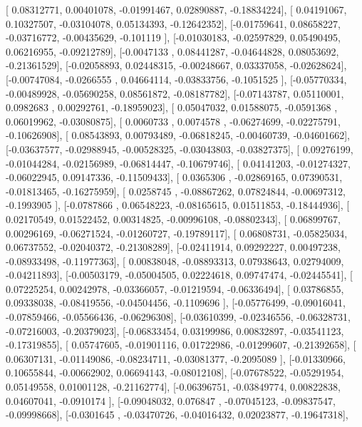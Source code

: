 \documentclass{article}
\begin{document}
       [ 0.08312771,  0.00401078, -0.01991467,  0.02890887, -0.18834224],
       [ 0.04191067,  0.10327507, -0.03104078,  0.05134393, -0.12642352],
       [-0.01759641,  0.08658227, -0.03716772, -0.00435629, -0.101119  ],
       [-0.01030183, -0.02597829,  0.05490495,  0.06216955, -0.09212789],
       [-0.0047133 ,  0.08441287, -0.04644828,  0.08053692, -0.21361529],
       [-0.02058893,  0.02448315, -0.00248667,  0.03337058, -0.02628624],
       [-0.00747084, -0.0266555 ,  0.04664114, -0.03833756, -0.1051525 ],
       [-0.05770334, -0.00489928, -0.05690258,  0.08561872, -0.08187782],
       [-0.07143787,  0.05110001,  0.0982683 ,  0.00292761, -0.18959023],
       [ 0.05047032,  0.01588075, -0.0591368 ,  0.06019962, -0.03080875],
       [ 0.0060733 ,  0.0074578 , -0.06274699, -0.02275791, -0.10626908],
       [ 0.08543893,  0.00793489, -0.06818245, -0.00460739, -0.04601662],
       [-0.03637577, -0.02988945, -0.00528325, -0.03043803, -0.03827375],
       [ 0.09276199, -0.01044284, -0.02156989, -0.06814447, -0.10679746],
       [ 0.04141203, -0.01274327, -0.06022945,  0.09147336, -0.11509433],
       [ 0.0365306 , -0.02869165,  0.07390531, -0.01813465, -0.16275959],
       [ 0.0258745 , -0.08867262,  0.07824844, -0.00697312, -0.1993905 ],
       [-0.0787866 ,  0.06548223, -0.08165615,  0.01511853, -0.18444936],
       [ 0.02170549,  0.01522452,  0.00314825, -0.00996108, -0.08802343],
       [ 0.06899767,  0.00296169, -0.06271524, -0.01260727, -0.19789117],
       [ 0.06808731, -0.05825034,  0.06737552, -0.02040372, -0.21308289],
       [-0.02411914,  0.09292227,  0.00497238, -0.08933498, -0.11977363],
       [ 0.00838048, -0.08893313,  0.07938643,  0.02794009, -0.04211893],
       [-0.00503179, -0.05004505,  0.02224618,  0.09747474, -0.02445541],
       [ 0.07225254,  0.00242978, -0.03366057, -0.01219594, -0.06336494],
       [ 0.03786855,  0.09338038, -0.08419556, -0.04504456, -0.1109696 ],
       [-0.05776499, -0.09016041, -0.07859466, -0.05566436, -0.06296308],
       [-0.03610399, -0.02346556, -0.06328731, -0.07216003, -0.20379023],
       [-0.06833454,  0.03199986,  0.00832897, -0.03541123, -0.17319855],
       [ 0.05747605, -0.01901116,  0.01722986, -0.01299607, -0.21392658],
       [ 0.06307131, -0.01149086, -0.08234711, -0.03081377, -0.2095089 ],
       [-0.01330966,  0.10655844, -0.00662902,  0.06694143, -0.08012108],
       [-0.07678522, -0.05291954,  0.05149558,  0.01001128, -0.21162774],
       [-0.06396751, -0.03849774,  0.00822838,  0.04607041, -0.0910174 ],
       [-0.09048032,  0.076847  , -0.07045123, -0.09837547, -0.09998668],
       [-0.0301645 , -0.03470726, -0.04016432,  0.02023877, -0.19647318],
\end{document}
